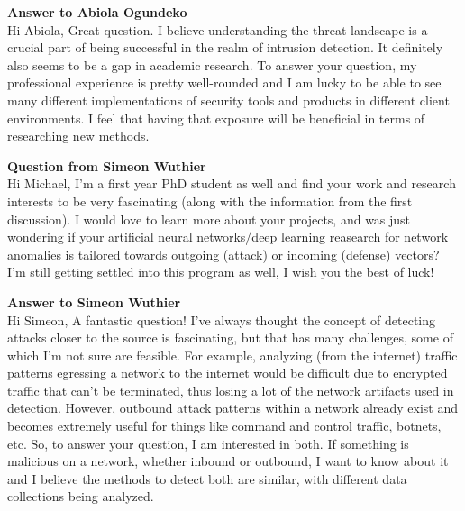 \documentclass[11pt]{article}
\begin{document}
\textbf{Answer to Abiola Ogundeko}\\
Hi Abiola, Great question. I believe understanding the threat landscape is a crucial part of being successful in the realm of intrusion detection. It definitely also seems to be a gap in academic research. To answer your question, my professional experience is pretty well-rounded and I am lucky to be able to see many different implementations of security tools and products in different client environments. I feel that having that exposure will be beneficial in terms of researching new methods.

\textbf{Question from Simeon Wuthier}\\
Hi Michael, I'm a first year PhD student as well and find your work and research interests to be very fascinating (along with the information from the first discussion). I would love to learn more about your projects, and was just wondering if your artificial neural networks/deep learning reasearch for network anomalies is tailored towards outgoing (attack) or incoming (defense) vectors? I'm still getting settled into this program as well, I wish you the best of luck!

\textbf{Answer to Simeon Wuthier}\\
Hi Simeon, A fantastic question! I've always thought the concept of detecting attacks closer to the source is fascinating, but that has many challenges, some of which I'm not sure are feasible. For example, analyzing (from the internet) traffic patterns egressing a network to the internet would be difficult due to encrypted traffic that can't be terminated, thus losing a lot of the network artifacts used in detection. However, outbound attack patterns within a network already exist and becomes extremely useful for things like command and control traffic, botnets, etc. So, to answer your question, I am interested in both. If something is malicious on a network, whether inbound or outbound, I want to know about it and I believe the methods to detect both are similar, with different data collections being analyzed.
\end{document}
